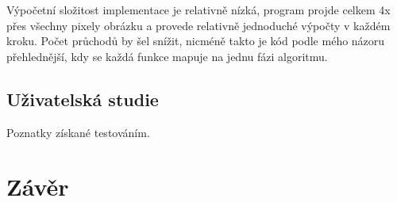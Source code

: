 \documentclass[11pt,a4paper,oneside]{article}
\begin{document}
Výpočetní složitost implementace je relativně nízká, program projde celkem 4x
přes všechny pixely obrázku a provede relativně jednoduché výpočty v každém
kroku. Počet průchodů by šel snížit, nicméně takto je kód podle mého názoru
přehlednější, kdy se každá funkce mapuje na jednu fázi algoritmu.

\subsection{Uživatelská studie}

Poznatky získané testováním.


\section{Závěr}



\end{document}
